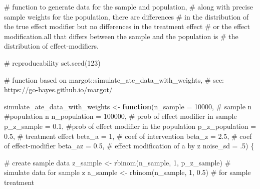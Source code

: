 \documentclass[
  singlecolumn]{article}
\newenvironment{Shaded}{\begin{snugshade}}{\end{snugshade}}
\newcommand{\AttributeTok}[1]{\textcolor[rgb]{0.40,0.45,0.13}{#1}}
\newcommand{\CommentTok}[1]{\textcolor[rgb]{0.37,0.37,0.37}{#1}}
\newcommand{\ControlFlowTok}[1]{\textcolor[rgb]{0.00,0.23,0.31}{\textbf{#1}}}
\newcommand{\DecValTok}[1]{\textcolor[rgb]{0.68,0.00,0.00}{#1}}
\newcommand{\FloatTok}[1]{\textcolor[rgb]{0.68,0.00,0.00}{#1}}
\newcommand{\FunctionTok}[1]{\textcolor[rgb]{0.28,0.35,0.67}{#1}}
\newcommand{\NormalTok}[1]{\textcolor[rgb]{0.00,0.23,0.31}{#1}}
\newcommand{\OtherTok}[1]{\textcolor[rgb]{0.00,0.23,0.31}{#1}}
\begin{document}
\begin{Shaded}
\begin{Highlighting}[]
\CommentTok{\# function to generate data for the sample and population, }
\CommentTok{\# along with precise sample weights for the population, there are differences }
\CommentTok{\# in the distribution of the true effect modifier but no differences in the treatment effect }
\CommentTok{\# or the effect modification.all that differs between the sample and the population is }
\CommentTok{\# the distribution of effect{-}modifiers.}


\CommentTok{\# reproducability}
\FunctionTok{set.seed}\NormalTok{(}\DecValTok{123}\NormalTok{)}


\CommentTok{\# function based on margot::simulate\_ate\_data\_with\_weights, }
\CommentTok{\# see: https://go{-}bayes.github.io/margot/}

\NormalTok{simulate\_ate\_data\_with\_weights }\OtherTok{\textless{}{-}} \ControlFlowTok{function}\NormalTok{(}\AttributeTok{n\_sample =} \DecValTok{10000}\NormalTok{, }\CommentTok{\# sample n}
                                           \CommentTok{\#population n}
                                           \AttributeTok{n\_population =} \DecValTok{100000}\NormalTok{,}
                                           \CommentTok{\# prob of effect modifier in sample}
                                           \AttributeTok{p\_z\_sample =} \FloatTok{0.1}\NormalTok{,}
                                           \CommentTok{\#prob of effect modifier in the population}
                                           \AttributeTok{p\_z\_population =} \FloatTok{0.5}\NormalTok{,}
                                           \CommentTok{\# treatment effect}
                                           \AttributeTok{beta\_a =} \DecValTok{1}\NormalTok{,}
                                           \CommentTok{\# coef of intervention}
                                           \AttributeTok{beta\_z =} \FloatTok{2.5}\NormalTok{,}
                                           \CommentTok{\# coef  of effect{-}modifier}
                                           \AttributeTok{beta\_az =} \FloatTok{0.5}\NormalTok{,}
                                           \CommentTok{\# effect modification of a by z}
                                           \AttributeTok{noise\_sd =}\NormalTok{ .}\DecValTok{5}\NormalTok{) \{}

  \CommentTok{\# create sample data}
\NormalTok{  z\_sample }\OtherTok{\textless{}{-}} \FunctionTok{rbinom}\NormalTok{(n\_sample, }\DecValTok{1}\NormalTok{, p\_z\_sample) }\CommentTok{\# simulate data for sample z}
\NormalTok{  a\_sample }\OtherTok{\textless{}{-}} \FunctionTok{rbinom}\NormalTok{(n\_sample, }\DecValTok{1}\NormalTok{, }\FloatTok{0.5}\NormalTok{) }\CommentTok{\# for sample treatment}
  

\end{Highlighting}
\end{Shaded}
\end{document}

